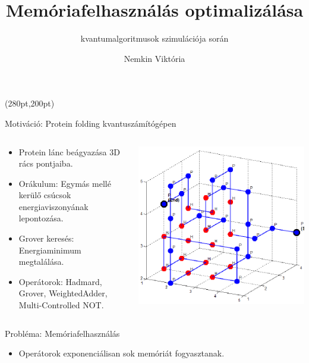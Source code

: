 \documentclass[aspectratio=169]{beamer}
\author[Nemkin Viktória]{Nemkin Viktória}
\institute[]{
\begin{small}dr. Friedl Katalin\end{small}\\
\begin{footnotesize}Számítástudományi és Információelméleti Tanszék\end{footnotesize}
}
\title{Memóriafelhasználás optimalizálása}
\subtitle{kvantumalgoritmusok szimulációja során}
\date{}
\begin{document}
\begin{frame}
\titlepage

\begin{textblock*}{150pt}(280pt,200pt) %

\end{textblock*}
\end{frame}


\begin{frame}{Motiváció: Protein folding kvantuszámítógépen}

\begin{columns}
\begin{column}{0.5\textwidth}
\begin{itemize}
    \item Protein lánc beágyazása 3D rács pontjaiba.
    \item Orákulum: Egymás mellé kerülő csúcsok energiaviszonyának lepontozása.
    \item Grover keresés: Energiaminimum megtalálása.
    \item Operátorok: Hadmard, Grover, WeightedAdder, Multi-Controlled NOT.
\end{itemize}

\end{column}
\begin{column}{0.5\textwidth}
    \begin{center}
     \includegraphics[width=\textwidth]{./figures/Protein-folds-with-length-36-amino-acids-18-contacts.png}
     \end{center}
\end{column}
\end{columns}

\end{frame}


\begin{frame}{Probléma: Memóriafelhasználás}
\begin{itemize}
    \item Operátorok exponenciálisan sok memóriát fogyasztanak.
\end{itemize}
\end{frame}
\end{document}
